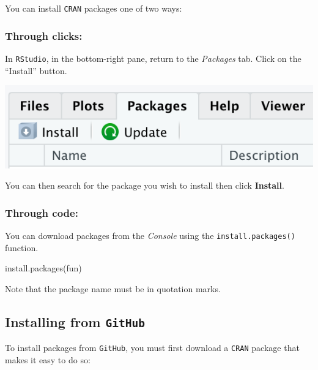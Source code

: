 \documentclass[
]{book}
\newenvironment{Shaded}{\begin{snugshade}}{\end{snugshade}}
\newcommand{\FunctionTok}[1]{\textcolor[rgb]{0.00,0.00,0.00}{#1}}
\newcommand{\NormalTok}[1]{#1}
\newcommand{\StringTok}[1]{\textcolor[rgb]{0.31,0.60,0.02}{#1}}
\begin{document}
You can install \texttt{CRAN} packages one of two ways:

\hypertarget{through-clicks}{%
\subsubsection*{Through clicks:}\label{through-clicks}}

In \texttt{RStudio}, in the bottom-right pane, return to the \emph{Packages} tab. Click on the ``Install'' button.

\includegraphics{img/rstudio_install-package.png}

You can then search for the package you wish to install then click \textbf{Install}.

\hypertarget{through-code}{%
\subsubsection*{Through code:}\label{through-code}}

You can download packages from the \emph{Console} using the \texttt{install.packages()} function.

\begin{Shaded}
\begin{Highlighting}[]
\FunctionTok{install.packages}\NormalTok{(}\StringTok{\textquotesingle{}fun\textquotesingle{}}\NormalTok{)}
\end{Highlighting}
\end{Shaded}

Note that the package name must be in quotation marks.

\hypertarget{installing-from-github}{%
\subsection*{\texorpdfstring{Installing from \texttt{GitHub}}{Installing from GitHub}}\label{installing-from-github}}

To install packages from \texttt{GitHub}, you must first download a \texttt{CRAN} package that makes it easy to do so:
\end{document}
